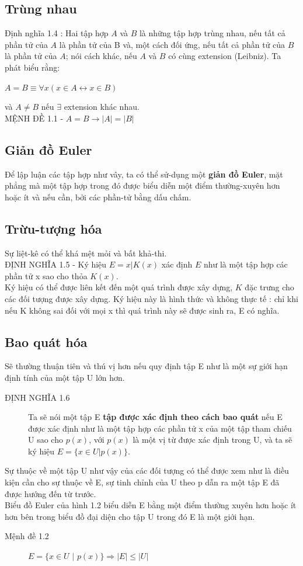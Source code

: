 \documentclass[11pt,a4paper]{report}
\begin{document}
\subsection{Trùng nhau}
Định nghĩa 1.4 : Hai tập hợp $A$ và $B$ là những tập hợp trùng nhau, nếu tất cả phần tử của $A$ là phần tử của B và, một cách đối ứng, nếu tất cả phần tử của $B$ là phần tử của $A$; nói cách khác, nếu $A$ và $B$ có cùng extension (Leibniz). Ta phát biểu rằng:
\begin{center}
	$A = B \equiv \forall x (x\in A \leftrightarrow x \in B)$
\end{center}
và $A \neq B$ nếu $\exists$ extension khác nhau.\\
MỆNH ĐỀ 1.1 - $A = B \rightarrow |A| = |B|$
\subsection{Giản đồ Euler}
Để lập luận các tập hợp như vây, ta có thể sử-dụng một \textbf{giản đồ Euler}, mặt phẳng mà một tập hợp trong đó được biểu diễn một điểm thường-xuyên hơn hoặc ít và nếu cần, bởi các phần-tử bằng dấu chấm.
\subsection{Trừu-tượng hóa}
Sự liệt-kê có thể khá mệt mỏi và bất khả-thi.\\
ĐỊNH NGHĨA 1.5 - Ký hiệu $E = { x|K(x) }$ xác định $E$ như là một tập hợp các phần tử x sao cho thỏa $K(x)$.\\
Ký hiệu có thể được liên kết đến một quá trình được xây dựng, $K$ đặc trưng cho các đối tượng được xây dựng. Ký hiệu này là hình thức và không thực tế : chỉ khi nếu K không sai đối với mọi x thì quá trình này sẽ được sinh ra, E có nghĩa.
\subsection{Bao quát hóa}
Sẽ thường thuận tiên và thú vị hơn nếu quy định tập E như là một sự giới hạn định tính của một tập U lớn hơn.
\begin{description}
	\item[ĐỊNH NGHĨA 1.6]
	Ta sẽ nói một tập E \textbf{tập được xác định theo cách bao quát} nếu E được xác định như là một tập hợp các phần tử x của một tập tham chiếu U sao cho $p(x)$, với $p(x)$ là một vị từ được xác định trong U, và ta sẽ ký hiệu $E = \{ x\in U | p(x) \}$.
\end{description}
Sự thuộc về một tập U như vậy của các đối tượng có thể được xem như là điều kiện cần cho sự thuộc về E, sự tinh chỉnh của U theo p dẫn ra một tập E đã được hướng đến từ trước.\\
Biểu đồ Euler của hình 1.2 biểu diễn E bằng một điểm thường xuyên hơn hoặc ít hơn bên trong biểu đồ đại diện cho tập U trong đó E là một giới hạn.
\begin{description}
	\item[Mệnh đề 1.2] $E = \{ x\in U \text{ | } p(x) \} \Rightarrow |E| \leq |U|$
\end{description}
\end{document}
